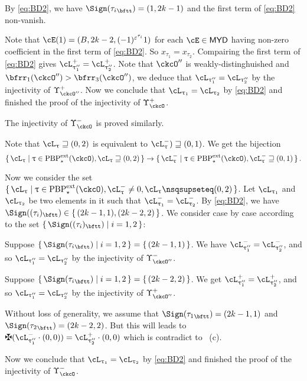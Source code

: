 \documentclass[12pt,a4paper]{amsart}
\def\MYD{{\mathsf{MYD}}}
\def\pac#1{\ac_{#1}^+}
\def\nac#1{\ac_{#1}^-}
\def\ttail#1{{#1}_{\bftt}}
\numberwithin{equation}{section}
\theoremstyle{remark}
\def\PBPes{\mathrm{PBP}^{\mathrm{ext}}_{\star}}
\def\uptaupp{\uptau^{\prime\prime}}
\begin{document}
  By \eqref{eq:BD2}, we have $\Sign(\ttail{\tau_{i}}) = (1,2k-1)$ and the first term of \eqref{eq:BD2} non-vanish.

    Note that $\cE(1) = (B,2k-2,(-1)^{\varepsilon^{\tau_{i}}}1)$ for each $\cE\in \MYD$ having non-zero
    coefficient in the first term of \eqref{eq:BD2}. So $x_{\tau_{1}}=x_{\tau_{2}}$.
    Compairing the first term of \eqref{eq:BD2} gives $\pac{\uptaupp_{1}}=\pac{\uptaupp_{2}}$.
    Note that $\ckcO''$ is weakly-distinghuished and $\bfrr_{1}(\ckcO'')>\bfrr_{3}(\ckcO'')$, we deduce that
    $\ac_{\uptaupp_{1}}=\ac_{\uptaupp_{2}}$ by the injectivity of $\Upsilon_{\ckcO''}^{+}$.
    Now we conclude that $\ac_{ \uptau_{1} }=\ac_{ \uptau_{2} }$ by \eqref{eq:BD2} and
    finished the proof of the injectivity of $\Upsilon_{\ckcO}^{+}$.

    \smallskip

    The injectivity of $\Upsilon_{\ckcO}^{-}$ is proved similarly.

  Note that $\ac_{\uptau}\sqsupseteq (0,2)$ is equivalent to
  $\nac{\uptau})\sqsupseteq (0,1)$.
  We get the bijection
  \[
    \set{\ac_{\uptau}|\uptau\in \PBPes(\ckcO),\ac_{\uptau}\sqsupseteq (0,2)} \rightarrow
    \set{\nac{\uptau}|\uptau\in \PBPes(\ckcO),\nac{\uptau}\sqsupseteq (0,1)}.
  \]

  Now we consider the set
  $\set{\ac_{\uptau}|\uptau\in \PBPes(\ckcO),\nac{\uptau}\neq 0, \ac_{\uptau}\nsqsupseteq (0,2)}$.
  Let $\ac_{\uptau_{1}}$ and $\ac_{\uptau_{2}}$ be two elements in it such that
  $\nac{\uptau_{1}}=\nac{\uptau_{2}}$.
  By \eqref{eq:BD2}, we have $\Sign((\tau_{i})_{\bftt}) \in \set{ (2k-1,1),(2k-2,2)}$.
  We consider case by case according to the set $\set{\Sign((\tau_{i})_{\bftt})|i=1,2}$:
  \begin{enumPF}
    \item Suppose
    $\set{\Sign({\tau_{i}}_{\bftt})|i=1,2} = \set{(2k-1,1)}$.
    We have $\nac{\uptau''_{1}} = \nac{\uptau''_{2}}$, and so
    $\ac_{\uptaupp_{1}}=\ac_{\uptaupp_{2}}$ by the injectivity of $\Upsilon_{\ckcO''}^{-}$.
    \item Suppose
    $\set{\Sign({\tau_{i}}_{\bftt})|i=1,2} = \set{(2k-2,2)}$. We get
    $\pac{\uptau''_{1}} = \pac{\uptau''_{2}}$, and so
    $\ac_{\uptaupp_{1}}=\ac_{\uptaupp_{2}}$ by the injectivity of $\Upsilon_{\ckcO''}^{+}$.
    \item
    Without loss of generality, we assume that
    $\Sign({\tau_{1}}_{\bftt}) = (2k-1,1)$ and
    $\Sign({\tau_{2}}_{\bftt}) = (2k-2,2)$.
    But this will leads to
    $\maltese (\nac{\uptau''_{1}}\cdot (0,0)) = \pac{\uptau''_{2}}\cdot (0,0)$
    which is contradict to ~(c).
  \end{enumPF}
  Now we conclude that $\ac_{ \uptau_{1} }=\ac_{ \uptau_{2} }$ by \eqref{eq:BD2} and
  finished the proof of the injectivity of $\Upsilon_{\ckcO}^{-}$.
\end{document}
